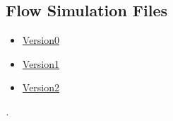 \documentclass[a4paper,12pt,oneside]{book}
\begin{document}
\subsection{Flow Simulation Files}
\begin{itemize}
    \item \href{https://drive.google.com/open?id=0B8nJz0e_p6YNY2tDaUpiR3BRZXc}{Version0}
    \item \href{https://drive.google.com/open?id=0B8nJz0e_p6YNaVZpd2Y5OVdYSVE}{Version1}
    \item \href{https://drive.google.com/open?id=0B8nJz0e_p6YNTGNyNHEzUktRTFk}{Version2}
\end{itemize}

\begin{thebibliography}{li}
{\em .}


\end{thebibliography}
\end{document}
